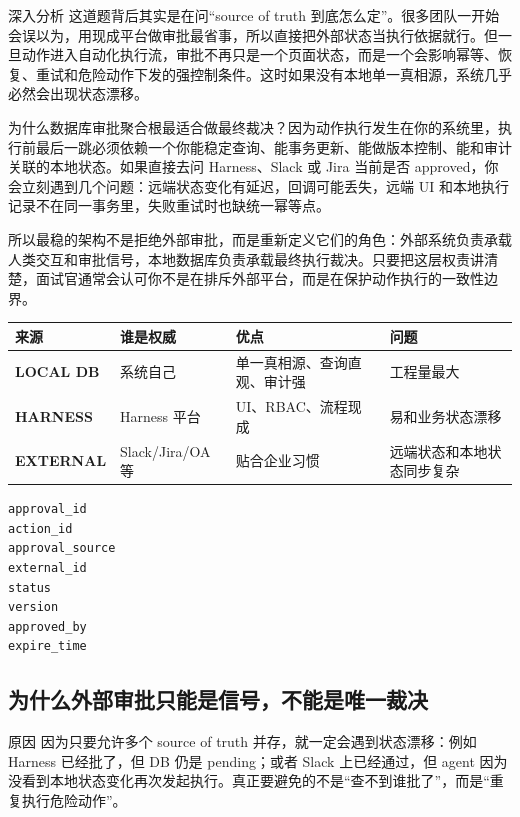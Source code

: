 \documentclass[12pt]{article}
\begin{document}
\begin{analysisBox}{深入分析}
这道题背后其实是在问“source of truth 到底怎么定”。很多团队一开始会误以为，用现成平台做审批最省事，所以直接把外部状态当执行依据就行。但一旦动作进入自动化执行流，审批不再只是一个页面状态，而是一个会影响幂等、恢复、重试和危险动作下发的强控制条件。这时如果没有本地单一真相源，系统几乎必然会出现状态漂移。

为什么数据库审批聚合根最适合做最终裁决？因为动作执行发生在你的系统里，执行前最后一跳必须依赖一个你能稳定查询、能事务更新、能做版本控制、能和审计关联的本地状态。如果直接去问 Harness、Slack 或 Jira 当前是否 approved，你会立刻遇到几个问题：远端状态变化有延迟，回调可能丢失，远端 UI 和本地执行记录不在同一事务里，失败重试时也缺统一幂等点。

所以最稳的架构不是拒绝外部审批，而是重新定义它们的角色：外部系统负责承载人类交互和审批信号，本地数据库负责承载最终执行裁决。只要把这层权责讲清楚，面试官通常会认可你不是在排斥外部平台，而是在保护动作执行的一致性边界。
\end{analysisBox}

\begin{center}
\small
\begin{tabularx}{\textwidth}{>{\bfseries}lXXX}
\toprule
来源 & 谁是权威 & 优点 & 问题 \\
\midrule
LOCAL DB & 系统自己 & 单一真相源、查询直观、审计强 & 工程量最大 \\
HARNESS & Harness 平台 & UI、RBAC、流程现成 & 易和业务状态漂移 \\
EXTERNAL & Slack/Jira/OA 等 & 贴合企业习惯 & 远端状态和本地状态同步复杂 \\
\bottomrule
\end{tabularx}
\end{center}

\begin{lstlisting}[caption={ApprovalAggregate 的建议最小字段}]
approval_id
action_id
approval_source
external_id
status
version
approved_by
expire_time
\end{lstlisting}

\subsection{为什么外部审批只能是信号，不能是唯一裁决}
\begin{qaBox}{原因}
因为只要允许多个 source of truth 并存，就一定会遇到状态漂移：例如 Harness 已经批了，但 DB 仍是 pending；或者 Slack 上已经通过，但 agent 因为没看到本地状态变化再次发起执行。真正要避免的不是“查不到谁批了”，而是“重复执行危险动作”。
\end{qaBox}
\end{document}
